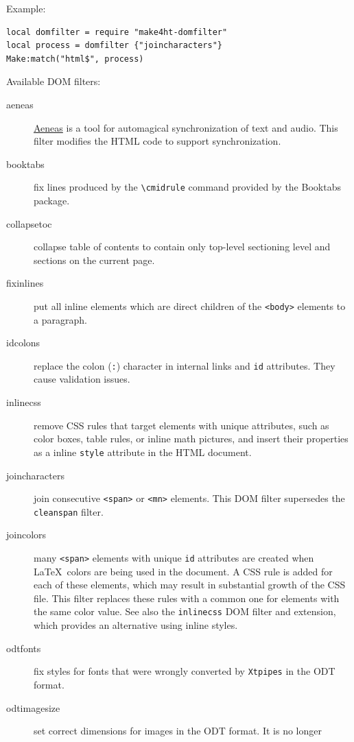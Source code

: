 Example:

\begin{verbatim}
local domfilter = require "make4ht-domfilter"
local process = domfilter {"joincharacters"}
Make:match("html$", process)
\end{verbatim}

Available DOM filters:

\begin{description}
\item[aeneas]
\href{https://www.readbeyond.it/aeneas/}{Aeneas} is a tool for
automagical synchronization of text and audio. This filter modifies the
HTML code to support synchronization.
\item[booktabs]
fix lines produced by the \texttt{\textbackslash{}cmidrule} command
provided by the Booktabs package.
\item[collapsetoc]
collapse table of contents to contain only top-level sectioning level
and sections on the current page.
\item[fixinlines]
put all inline elements which are direct children of the
\texttt{\textless{}body\textgreater{}} elements to a paragraph.
\item[idcolons]
replace the colon (\texttt{:}) character in internal links and
\texttt{id} attributes. They cause validation issues.
\item[inlinecss]
remove CSS rules that target elements with unique attributes, such as
color boxes, table rules, or inline math pictures, and insert their
properties as a inline \texttt{style} attribute in the HTML document.
\item[joincharacters]
join consecutive \texttt{\textless{}span\textgreater{}} or
\texttt{\textless{}mn\textgreater{}} elements. This DOM filter
supersedes the \texttt{cleanspan} filter.
\item[joincolors]
many \texttt{\textless{}span\textgreater{}} elements with unique
\texttt{id} attributes are created when \LaTeX~colors are being used in
the document. A CSS rule is added for each of these elements, which may
result in substantial growth of the CSS file. This filter replaces these
rules with a common one for elements with the same color value. See also
the \texttt{inlinecss} DOM filter and extension, which provides an
alternative using inline styles.
\item[odtfonts]
fix styles for fonts that were wrongly converted by \texttt{Xtpipes} in
the ODT format.
\item[odtimagesize]
set correct dimensions for images in the ODT format. It is no longer

\end{description}
